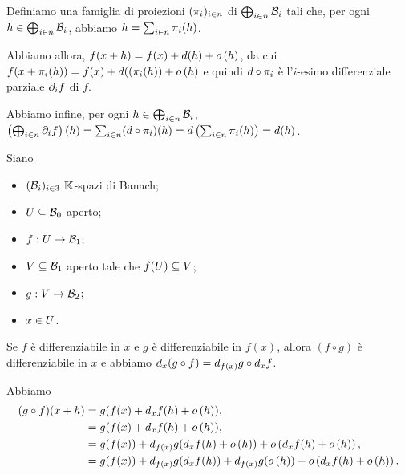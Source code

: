 \Proof Definiamo una famiglia di proiezioni $(\Projection_i)_{i \in n}$ di $\bigoplus_{i \in n} \mathcal{B}_i$ tali che, per ogni $h \in \bigoplus_{i \in n} \mathcal{B}_i$, abbiamo $h = \sum_{i \in n} \Projection_i(h)$.
\par Abbiamo allora,
$f(x + h) = f(x) + \TotalDifferential(h) + \Littleo{h}$, da cui
$f(x + \Projection_i(h)) = f(x) + \TotalDifferential((\Projection_i(h)) + \Littleo{h}$
e quindi $\TotalDifferential \circ \Projection_i$ \`e l'$i$-esimo differenziale parziale $\PartialDifferential{f}{i}$ di $f$.
\par Abbiamo infine, per ogni $h \in \bigoplus_{i \in n} \mathcal{B}_i$, $\left ( \bigoplus_{i \in n} \PartialDifferential{f}{i} \right )(h) = \sum_{i \in n} (\TotalDifferential \circ \Projection_i)(h) = \TotalDifferential \left ( \sum_{i \in n} \Projection_i(h) \right ) = \TotalDifferential(h)$. \EndProof
\begin{Theorem}
	Siano
	\begin{itemize}
		\item $(\mathcal{B}_i)_{i \in 3}$ $\mathbb{K}$-spazi di Banach;
		\item $U \subseteq \mathcal{B}_0$ aperto;
		\item $f: U \rightarrow \mathcal{B}_1$;
		\item $V \subseteq \mathcal{B}_1$ aperto tale che $f(U) \subseteq V$;
		\item $g: V \rightarrow \mathcal{B}_2$;
		\item $x \in U$.
	\end{itemize}
	Se $f$ \`e differenziabile in $x$ e $g$ \`e differenziabile in $f(x)$, allora $(f \circ g)$ \`e differenziabile in $x$ e abbiamo $\TotalDifferential{(g \circ f)}[x] = \TotalDifferential{g}[f(x)] \circ \TotalDifferential{f}[x]$.
\end{Theorem}
\Proof Abbiamo
\begin{align*}
(g \circ f)(x + h) &= g(f(x) + \TotalDifferential{f}[x](h) + \Littleo{h}),\\
&= g(f(x) + \TotalDifferential{f}[x](h) + \Littleo{h}),\\
&= g(f(x)) + \TotalDifferential{g}[f(x)](\TotalDifferential{f}[x](h) + \Littleo{h}) + \Littleo{\TotalDifferential{f}[x](h) + \Littleo{h}},\\
&= g(f(x)) + \TotalDifferential{g}[f(x)](\TotalDifferential{f}[x](h)) + \TotalDifferential{g}[f(x)](\Littleo{h}) + \Littleo{\TotalDifferential{f}[x](h) + \Littleo{h}}.
\end{align*}
